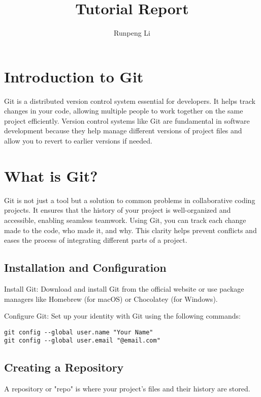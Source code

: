 \documentclass[10pt,twocolumn]{article}
\title{Tutorial Report}
\author{Runpeng Li}
\affiliation{Occidental College}
\begin{document}
\maketitle

\section{Introduction to Git}

Git is a distributed version control system essential for developers. It helps track changes in your code, allowing multiple people to work together on the same project efficiently. Version control systems like Git are fundamental in software development because they help manage different versions of project files and allow you to revert to earlier versions if needed.

\section{What is Git?}

Git is not just a tool but a solution to common problems in collaborative coding projects. It ensures that the history of your project is well-organized and accessible, enabling seamless teamwork. Using Git, you can track each change made to the code, who made it, and why. This clarity helps prevent conflicts and eases the process of integrating different parts of a project.

\subsection{Installation and Configuration}

Install Git: Download and install Git from the official website or use package managers like Homebrew (for macOS) or Chocolatey (for Windows).

Configure Git: Set up your identity with Git using the following commands:

\begin{verbatim}
git config --global user.name "Your Name"
git config --global user.email "@email.com"
\end{verbatim}

\subsection{Creating a Repository}

A repository or "repo" is where your project's files and their history are stored.
\end{document}
